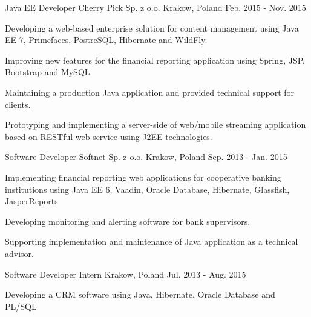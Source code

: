 \begin{cventries}
  \cventry
    {Java EE Developer} %
    {Cherry Pick Sp. z o.o.} %
    {Krakow, Poland} %
    {Feb. 2015 - Nov. 2015} %
    {
      \begin{cvitems} %
        \item {Developing a web-based enterprise solution for content management using
Java EE 7, Primefaces, PostreSQL, Hibernate and WildFly.}
		\item {Improving new features for the financial reporting application using Spring, JSP, Bootstrap and MySQL.}
		\item {Maintaining a production Java application and provided technical support for clients.}
        \item {Prototyping and implementing a server-side of web/mobile
streaming application based on RESTful web service using J2EE technologies.}
      \end{cvitems}
    }

  \cventry
    {Software Developer} %
    {Softnet Sp. z o.o.} %
    {Krakow, Poland} %
    {Sep. 2013 - Jan. 2015} %
    {
      \begin{cvitems} %
       \item {Implementing financial reporting web applications for cooperative banking institutions using Java EE 6, Vaadin, Oracle Database, Hibernate, Glassfish, JasperReports}
	  \item {Developing monitoring and alerting software for bank supervisors.} 
	  \item {Supporting implementation and maintenance of Java application as a technical advisor.}
      \end{cvitems}
    }
  \cventry
    {Software Developer Intern} %
    {} %
    {Krakow, Poland} %
    {Jul. 2013 - Aug. 2015} %
    {
      \begin{cvitems} %
       \item {Developing a CRM software using Java, Hibernate, Oracle Database and PL/SQL}
      \end{cvitems}
    }
\end{cventries}
